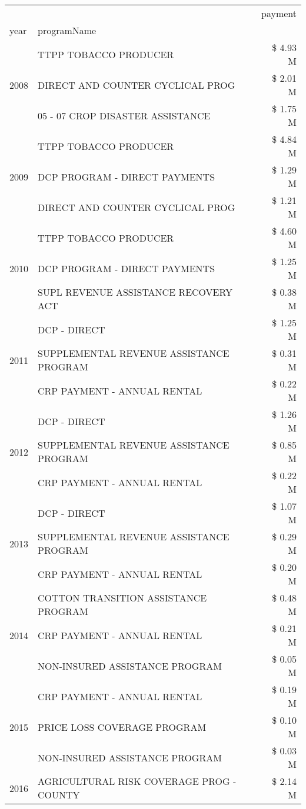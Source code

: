 \begin{tabular}{llr}
\toprule
 &  & payment \\
year & programName &  \\
\midrule
\multirow[t]{3}{*}{2008} & TTPP TOBACCO PRODUCER & \$ 4.93 M \\
 & DIRECT AND COUNTER CYCLICAL PROG & \$ 2.01 M \\
 & 05 - 07 CROP DISASTER ASSISTANCE & \$ 1.75 M \\
\cline{1-3}
\multirow[t]{3}{*}{2009} & TTPP TOBACCO PRODUCER & \$ 4.84 M \\
 & DCP PROGRAM - DIRECT PAYMENTS & \$ 1.29 M \\
 & DIRECT AND COUNTER CYCLICAL PROG & \$ 1.21 M \\
\cline{1-3}
\multirow[t]{3}{*}{2010} & TTPP TOBACCO PRODUCER & \$ 4.60 M \\
 & DCP PROGRAM - DIRECT PAYMENTS & \$ 1.25 M \\
 & SUPL REVENUE ASSISTANCE RECOVERY ACT & \$ 0.38 M \\
\cline{1-3}
\multirow[t]{3}{*}{2011} & DCP - DIRECT & \$ 1.25 M \\
 & SUPPLEMENTAL REVENUE ASSISTANCE PROGRAM & \$ 0.31 M \\
 & CRP PAYMENT - ANNUAL RENTAL & \$ 0.22 M \\
\cline{1-3}
\multirow[t]{3}{*}{2012} & DCP - DIRECT & \$ 1.26 M \\
 & SUPPLEMENTAL REVENUE ASSISTANCE PROGRAM & \$ 0.85 M \\
 & CRP PAYMENT - ANNUAL RENTAL & \$ 0.22 M \\
\cline{1-3}
\multirow[t]{3}{*}{2013} & DCP - DIRECT & \$ 1.07 M \\
 & SUPPLEMENTAL REVENUE ASSISTANCE PROGRAM & \$ 0.29 M \\
 & CRP PAYMENT - ANNUAL RENTAL & \$ 0.20 M \\
\cline{1-3}
\multirow[t]{3}{*}{2014} & COTTON TRANSITION ASSISTANCE PROGRAM & \$ 0.48 M \\
 & CRP PAYMENT - ANNUAL RENTAL & \$ 0.21 M \\
 & NON-INSURED ASSISTANCE PROGRAM & \$ 0.05 M \\
\cline{1-3}
\multirow[t]{3}{*}{2015} & CRP PAYMENT - ANNUAL RENTAL & \$ 0.19 M \\
 & PRICE LOSS COVERAGE PROGRAM & \$ 0.10 M \\
 & NON-INSURED ASSISTANCE PROGRAM & \$ 0.03 M \\
\cline{1-3}
\multirow[t]{3}{*}{2016} & AGRICULTURAL RISK COVERAGE PROG - COUNTY & \$ 2.14 M \\

\end{tabular}
